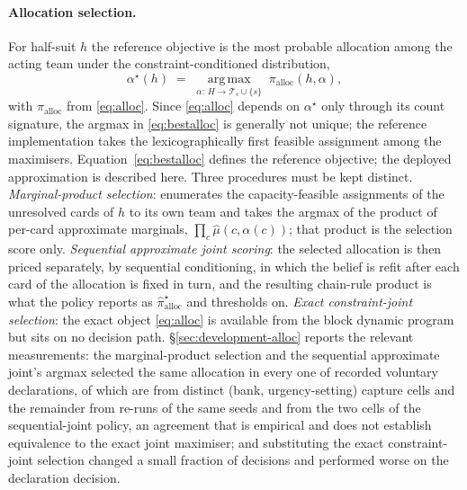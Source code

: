 \paragraph{Allocation selection.} For half-suit $h$ the reference objective is the most probable
allocation among the acting team under the constraint-conditioned distribution,
\begin{equation}
  \alpha^\star(h) \;=\; \operatorname*{arg\,max}_{\alpha:\,H \to \mathcal{T}_s \cup \{s\}}
  \; \pi_{\mathrm{alloc}}(h,\alpha),
  \label{eq:bestalloc}
\end{equation}
with $\pi_{\mathrm{alloc}}$ from \eqref{eq:alloc}. Since \eqref{eq:alloc} depends on
$\alpha^\star$ only through its count signature, the argmax in \eqref{eq:bestalloc} is generally
not unique; the reference implementation takes the lexicographically first feasible assignment
among the maximisers. Equation~\eqref{eq:bestalloc} defines the reference objective; the deployed
approximation is described here. Three procedures must be kept
distinct. \emph{Marginal-product selection}: \sestina{} enumerates the capacity-feasible
assignments of the unresolved cards of $h$ to its own team and takes the argmax of the product of
per-card approximate marginals, $\prod_{c} \hat\mu(c,\alpha(c))$; that product is the selection
score only. \emph{Sequential approximate joint scoring}: the selected allocation is then priced
separately, by sequential conditioning, in which the belief is refit after each card of the
allocation is fixed in turn, and the resulting chain-rule product is what the policy reports as
$\hat\pi^\star_{\mathrm{alloc}}$ and thresholds on. \emph{Exact constraint-joint selection}: the
exact object \eqref{eq:alloc} is available from the block dynamic program but sits on no decision
path. \S\ref{sec:development-alloc} reports the relevant measurements: the marginal-product
selection and the sequential approximate joint's argmax selected the same allocation in every one
of \vsevenLoneDeclsTotal{} recorded voluntary declarations, of which \vsevenLoneDeclsDistinct{} are
from distinct (bank, urgency-setting) capture cells and the remainder from re-runs of the same
seeds and from the two cells of the sequential-joint policy, an agreement that is empirical and
does not establish equivalence to the exact joint maximiser; and substituting the exact constraint-joint selection
changed a small fraction of decisions and performed worse on the declaration decision.


